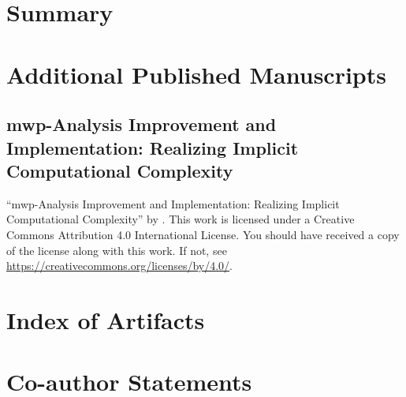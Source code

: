\chapter{Summary}\label{ch:summary}



\printbibliography[label=chap:references, title=References, heading=bibnumbered]

\appendix
\continousappendix

\chapter{Additional Published Manuscripts}\label{app:additional-manuscripts}

    \section{mwp-Analysis Improvement and Implementation: Realizing Implicit
    Computational Complexity}\label{sec:fscd}
    \pageIconAnalysis
    {\par\enquote{mwp-Analysis Improvement and Implementation: Realizing Implicit Computational Complexity}
    \textcopyright{ }by{ }\CTNT.
    \newline{}This work is licensed under a Creative Commons Attribution 4.0 International License.
    \newline{}You should have received a copy of the license along with this work.
    \newline{}If not, see \url{https://creativecommons.org/licenses/by/4.0/}.}
    
    \clearpage

\chapter{Index of Artifacts}\label{app:sec:artifacts}

\clearpage

\chapter{Co-author Statements}\label{app:sec:coauth}

\clearpage

\pagestyle{plain}
\printglossary[title={Index of Acronyms},type=\acronymtype,nonumberlist,style=longragged]
\clearpage

\pagestyle{plain}
\printglossary[type=symbols]
\clearpage

\printindex